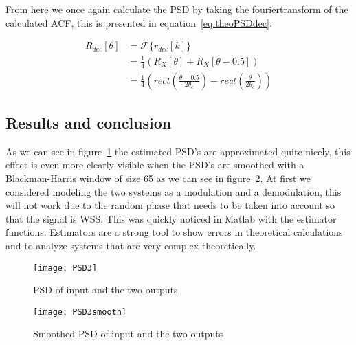 \documentclass[10pt]{article}
\begin{document}
From here we once again calculate the PSD by taking the fouriertransform of the
calculated ACF, this is presented in equation~\ref{eq:theoPSDdec}.

\begin{align}
  \label{eq:theoPSDdec}
  R_{dec}[\theta] & = \mathcal{F}\{r_{dec}[k]\} \nonumber \\
  & = \frac{1}{4}(R_X[\theta]+R_X[\theta-0.5]) \nonumber \\
  & = \frac{1}{4}(rect(\frac{\theta-0.5}{2\theta_c}) + rect(\frac{\theta}{2\theta_c}))
\end{align}

\subsection{Results and conclusion}

As we can see in figure~\ref{fig:PSD3} the estimated PSD's are approximated
quite nicely, this effect is even more clearly visible when the PSD's are smoothed
with a Blackman-Harris window of size 65 as we can see in figure~\ref{fig:PSD3smooth}.
At first we considered modeling the two systems as a modulation and a demodulation,
this will not work due to the random phase that needs to be taken into account so
 that the signal is WSS. This was quickly noticed in Matlab with the estimator
 functions. Estimators are a strong tool to show errors in theoretical calculations
  and to analyze systems that are very complex theoretically.

\begin{figure}[!hp]

    \begin{center}
      \texttt{[image: PSD3]}
    \caption{PSD of input and the two outputs \label{fig:PSD3}}
    \end{center}

\end{figure}

\begin{figure}[!hp]

    \begin{center}
      \texttt{[image: PSD3smooth]}
    \caption{Smoothed PSD of input and the two outputs\label{fig:PSD3smooth}}
    \end{center}

\end{figure}
\end{document}
